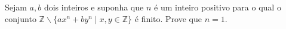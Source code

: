 Sejam \(a,b\) dois inteiros e suponha que \(n\) é um inteiro positivo para o qual o conjunto \(\mathbb{Z} \backslash \{ax^n + by^n \mid x,y \in \mathbb{Z}\}\) é finito. Prove que \(n=1\).
